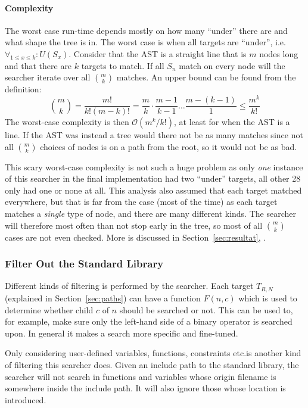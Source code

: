 \documentclass[a4paper,12pt]{article}
\newcommand{\Oh}[1]{\mathcal{O} (#1)}
\begin{document}
\paragraph{Complexity}
The worst case run-time depends mostly on how many ``under'' there are and what shape the
tree is in. The worst case is when all targets are ``under'', i.e.\@ $\forall_{1 \leq x
  \leq k} : U(S_x)$. Consider that the AST is a straight line that is $m$
nodes long and that there are $k$ targets to match. If all $S_n$ match on every node will the
searcher iterate over all $\binom{m}{k}$ matches. An upper bound can be found from the
definition:
\begin{equation*}
  \binom{m}{k} = \frac{m!}{k! (m-k)!} = \frac{m}{k} \cdot \frac{m-1}{k-1} \dots \frac{m -
    (k-1)}{1} \leq \frac{m^k}{k!}
\end{equation*}%
The worst-case complexity is then $\Oh{{m^k}/{k!}}$, at least for when the AST is a line. If the AST was instead a
tree would there not be as many matches since not all $\binom{m}{k}$ choices of nodes is
on a path from the root, so it would not be as bad.

This scary worst-case complexity is
not such a huge problem as only \emph{one} instance of this searcher in the final implementation
had two ``under'' targets, all other 28 only had one or none at all. This analysis also
assumed that each target matched everywhere, but that is far from the case (most of the
time) as each target matches a \emph{single} type of node, and there are many different
kinds. The searcher will therefore most often than not stop early in the tree, so most of
all $\binom{m}{k}$ cases are not even checked. More is discussed in Section~\ref{sec:resultat},
.

\subsubsection{Filter Out the Standard Library}\label{sec:filter:stdlib}
Different kinds of filtering is performed by the searcher. Each target $T_{R,N}$
(explained in Section~\ref{sec:paths}) can have a function $F(n,c)$ which is used to
determine whether child $c$ of $n$ should be searched or not. This can be used to, for
example, make sure only the left-hand side of a binary operator is searched upon. In
general it makes a search more specific and fine-tuned.

Only considering user-defined variables, functions, constraints etc.\@ is another kind of
filtering this searcher does. Given an include path to the standard library, the searcher
will not search in functions and variables whose origin filename is somewhere inside the
include path. It will also ignore those whose location is introduced.
\end{document}
